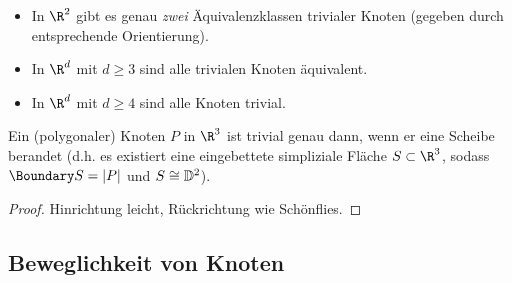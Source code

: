\begin{nt}
    \begin{itemize}
        \item
            In $\R^2$ gibt es genau \emph{zwei} Äquivalenzklassen trivialer Knoten (gegeben durch entsprechende Orientierung).
        \item
            In $\R^d$ mit $d \ge 3$ sind alle trivialen Knoten äquivalent.
        \item
            In $\R^d$ mit $d \ge 4$ sind alle Knoten trivial.
    \end{itemize}
\end{nt}

\begin{ex}
    Ein (polygonaler) Knoten $P$ in $\R^3$ ist trivial genau dann, wenn er eine Scheibe berandet (d.h. es existiert eine eingebettete simpliziale Fläche $S \subset \R^3$, sodass $\Boundary S = |P|$ und $S \cong \mathbb { D }^2$).
    \begin{proof}
        Hinrichtung leicht, Rückrichtung wie Schönflies.
    \end{proof}
\end{ex}

\subsection{Beweglichkeit von Knoten}


